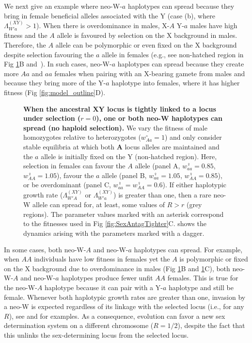 \documentclass[10pt,letterpaper]{article}
\begin{document}
We next give an example where neo-W-$a$ haplotypes can spread because they bring in female beneficial alleles associated with the Y (case (b), where $\Lambda_{W'a}^{(XY)}>1$). 
When there is overdominance in males, X-$A$ Y-$a$ males have high fitness and the $A$ allele is favoured by selection on the X background in males.
Therefore, the $A$ allele can be polymorphic or even fixed on the X background despite selection favouring the $a$ allele in females (e.g., see non-hatched region in Fig \ref{fig:regionplots}B and~\cite{Lloyd1977,Otto2014}). 
In such cases, neo-W-$a$ haplotypes can spread because they create more $Aa$ and $aa$ females when pairing with an X-bearing gamete from males and because they bring more of the Y-$a$ haplotype into females, where it has higher fitness (Fig \ref{fig:model_outline}D). 

\begin{figure}[!h]
\centering
\caption{
{\bf When the ancestral XY locus is tightly linked to a locus under selection ($r=0$), one or both neo-W haplotypes can spread (no haploid selection).}
We vary the fitness of male homozygotes relative to heterozygotes ($w_{Aa}^\circ=1$) and only consider stable equilibria at which both $\mathbf{A}$ locus alleles are maintained and the $a$ allele is initially fixed on the Y (non-hatched region). 
Here, selection in females can favour the $A$ allele (panel A, $w_{aa}^\female=0.85$, $w_{AA}^\female=1.05$), favour the $a$ allele (panel B, $w_{aa}^\female=1.05$, $w_{AA}^\female=0.85$), or be overdominant (panel C, $w_{aa}^\female=w_{AA}^\female=0.6$). 
If either haplotypic growth rate ($\Lambda_{W'A}^{(XY)}$ or $\Lambda_{W'a}^{(XY)}$) is greater than one, then a rare neo-W allele can spread for, at least, some values of $R>r$ (grey regions). 
The parameter values marked with an asterisk correspond to the fitnesses used in Fig \ref{fig:SexAntagTighter}C. 
 shows the dynamics arising with the parameters marked with a dagger. 
}
\label{fig:regionplots}
\end{figure}

In some cases, both neo-W-$A$ and neo-W-$a$ haplotypes can spread.
For example, when $AA$ individuals have low fitness in females yet the $A$ is polymorphic or fixed on the X background due to overdominance in males (Fig \ref{fig:regionplots}B and \ref{fig:regionplots}C), both neo-W-$A$ and neo-W-$a$ haplotypes produce fewer unfit $AA$ females.
This is true for the neo-W-$A$ haplotype because it can pair with a Y-$a$ haplotype and still be female. 
Whenever both haplotypic growth rates are greater than one, invasion by a neo-W is expected regardless of its linkage with the selected locus (i.e., for any $R$), see  and  for examples. 
As a consequence, evolution can favor a new sex determination system on a different chromosome ($R = 1/2$), despite the fact that this unlinks the sex-determining locus from the selected locus.
\end{document}
